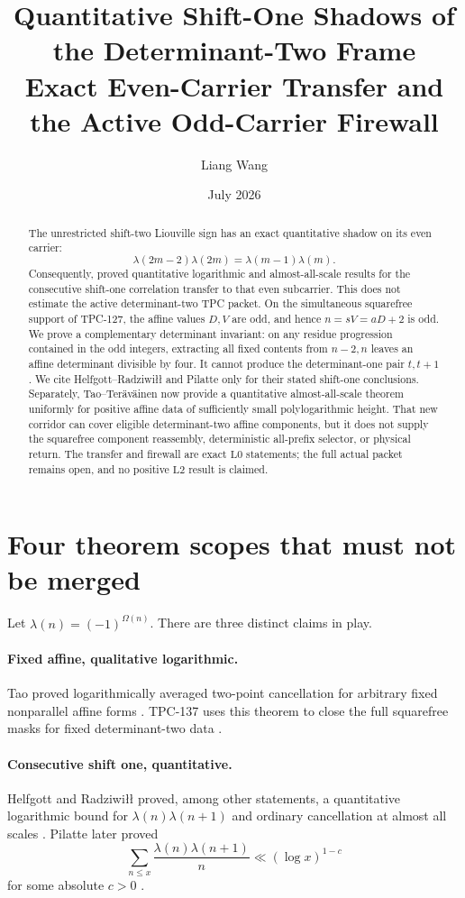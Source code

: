 \documentclass[11pt]{article}
\title{\textbf{Quantitative Shift-One Shadows of the
Determinant-Two Frame}\\
\large Exact Even-Carrier Transfer and the Active Odd-Carrier
Firewall}
\author{Liang Wang}
\date{July 2026}
\theoremstyle{definition}
\theoremstyle{remark}
\newcommand{\Lzero}{\mathrm{L0}}
\newcommand{\Ltwo}{\mathrm{L2}}
\begin{document}
\maketitle

\begin{abstract}
The unrestricted shift-two Liouville sign has an exact quantitative
shadow on its even carrier:
\[
 \lambda(2m-2)\lambda(2m)=\lambda(m-1)\lambda(m).
\]
Consequently, proved quantitative logarithmic and almost-all-scale
results for the consecutive shift-one correlation transfer to that
even subcarrier.  This does not estimate the active
determinant-two TPC packet.  On the simultaneous squarefree support
of TPC-127, the affine values \(D,V\) are odd, and hence
\(n=sV=aD+2\) is odd.  We prove a complementary determinant
invariant: on any residue progression contained in the odd
integers, extracting all fixed contents from \(n-2,n\) leaves an
affine determinant divisible by four.  It cannot produce the
determinant-one pair \(t,t+1\).  We cite
Helfgott--Radziwi{\l}{\l} and Pilatte only for their stated
shift-one conclusions.  Separately, Tao--Ter\"av\"ainen now provide
a quantitative almost-all-scale theorem uniformly for positive
affine data of sufficiently small polylogarithmic height.  That
new corridor can cover eligible determinant-two affine components,
but it does not supply the squarefree component reassembly,
deterministic all-prefix selector, or physical return.  The transfer
and firewall are exact \(\Lzero\) statements; the full actual packet
remains open, and no positive \(\Ltwo\) result is claimed.
\end{abstract}

\section{Four theorem scopes that must not be merged}

Let \(\lambda(n)=(-1)^{\Omega(n)}\).  There are three distinct
claims in play.

\paragraph{Fixed affine, qualitative logarithmic.}
Tao proved logarithmically averaged two-point cancellation for
arbitrary fixed nonparallel affine forms \citep{Tao2016LogChowla}.
TPC-137 uses this theorem to close the full squarefree masks for
fixed determinant-two data \citep{WangTPC137}.

\paragraph{Consecutive shift one, quantitative.}
Helfgott and Radziwi{\l}{\l} proved, among other statements, a
quantitative logarithmic bound for
\(\lambda(n)\lambda(n+1)\) and ordinary cancellation at almost all
scales \citep{HelfgottRadziwill2021}.  Pilatte later proved
\begin{equation}
 \sum_{n\le x}\frac{\lambda(n)\lambda(n+1)}n
 \ll(\log x)^{1-c}
\label{eq:pilatte}
\end{equation}
for some absolute \(c>0\) \citep{Pilatte2023}.
\end{document}
